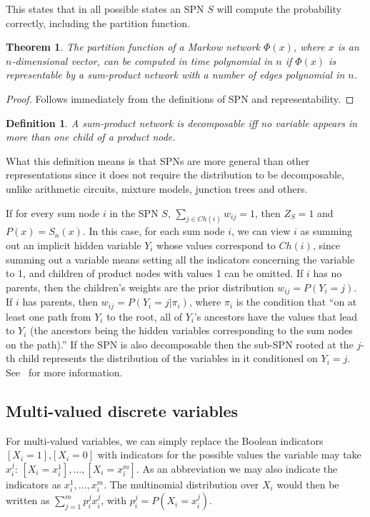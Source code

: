 \documentclass[a4paper,10pt]{article}
\theoremstyle{plain}
\newtheorem*{spn-def}{Definition}
\newtheorem*{spn-thm}{Theorem}
\begin{document}
This states that in all possible states an SPN $S$ will compute the probability correctly,
including the partition function.

\begin{spn-thm}
  The partition function of a Markow network $\Phi(x)$, where $x$ is an $n$-dimensional vector, can
  be computed in time polynomial in $n$ if $\Phi(x)$ is representable by a sum-product network with
  a number of edges polynomial in $n$.
\end{spn-thm}

\begin{proof}
  Follows immediately from the definitions of SPN and representability.
\end{proof}

\begin{spn-def}
  A sum-product network is decomposable iff no variable appears in more than one child of a product
  node.
\end{spn-def}

What this definition means is that SPNs are more general than other representations since it does
not require the distribution to be decomposable, unlike arithmetic circuits, mixture models,
junction trees and others.

If for every sum node $i$ in the SPN $S$, $\sum_{j\in Ch(i)}w_{ij}=1$, then $Z_S=1$ and $P(x)=
S_n(x)$. In this case, for each sum node $i$, we can view $i$ as summing out an implicit hidden
variable $Y_i$ whose values correspond to $Ch(i)$, since summing out a variable means setting all
the indicators concerning the variable to 1, and children of product nodes with values 1 can be
omitted. If $i$ has no parents, then the children's weights are the prior distribution $w_{ij}=
P(Y_i=j)$. If $i$ has parents, then $w_{ij}=P(Y_i=j|\pi_i)$, where $\pi_i$ is the condition that
``on at least one path from $Y_i$ to the root, all of $Y_i$'s ancestors have the values that lead
to $Y_i$ (the ancestors being the hidden variables corresponding to the sum nodes on the path).''
\cite{poon-domingos} If the SPN is also decomposable then the sub-SPN rooted at the $j$-th child
represents the distribution of the variables in it conditioned on $Y_i=j$. See~\cite{poon-domingos}
for more information.


\subsection{Multi-valued discrete variables}

For multi-valued variables, we can simply replace the Boolean indicators $[X_i=1]$,$[X_i=0]$ with
indicators for the possible values the variable may take $x_i^j$: $[X_i=x_i^1],\ldots,[X_i=x_i^m]$.
As an abbreviation we may also indicate the indicators as $x_i^1,\ldots,x_i^m$. The multinomial
distribution over $X_i$ would then be written as $\sum_{j=1}^m p_i^j x_i^j$, with $p_i^j=
P(X_i=x_i^j)$.
\end{document}

